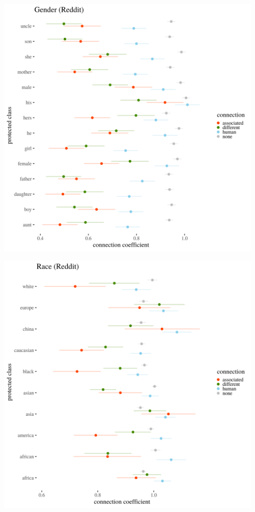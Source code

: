\documentclass[12pt,]{book}
\begin{document}
\includegraphics[width=14cm]{../images/visGenderReddit.png}

\includegraphics[width=14cm]{../images/visRaceReddit.png}
\end{document}
